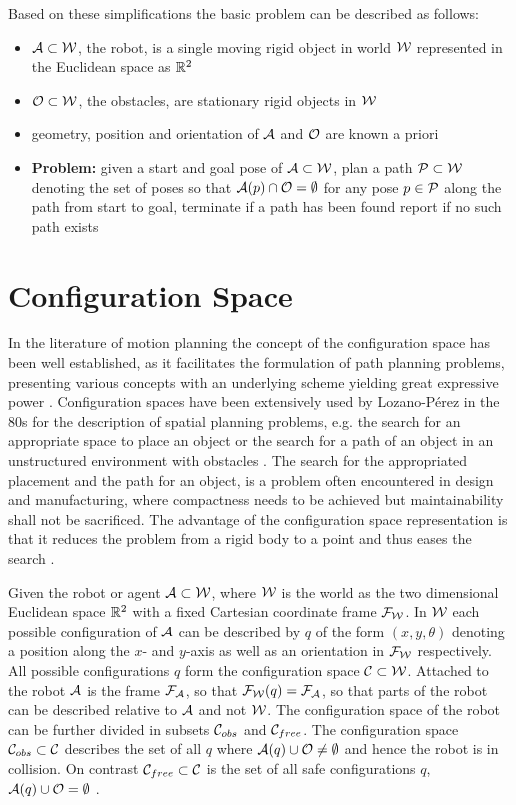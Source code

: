 Based on these simplifications the basic problem can be described as follows:
\begin{itemize}
\item $\mathcal{A} \subset \mathcal{W}$, the robot, is a single moving rigid object in world $\mathcal{W}$ represented in the Euclidean space as $\mathbb{R}^2$
\item $\mathcal{O} \subset \mathcal{W}$, the obstacles, are stationary rigid objects in $\mathcal{W}$
\item geometry, position and orientation of $\mathcal{A}$ and $\mathcal{O}$ are known a priori
\item \textbf{Problem:} given a start and goal pose of $\mathcal{A} \subset \mathcal{W}$, plan a path $\mathcal{P} \subset \mathcal{W}$ denoting the set of poses so that $\mathcal{A}(p) \cap \mathcal{O} = \emptyset$ for any pose  $p \in \mathcal{P}$ along the path from start to goal, terminate if a path has been found report if no such path exists
\end{itemize}

\cite{Latombe.1991} \cite{LaValle.2006}

\section{Configuration Space}
In the literature of motion planning the concept of the configuration space has been well established, as it facilitates the formulation of path planning problems, presenting various concepts with an underlying scheme yielding great expressive power \cite{LaValle.2006} \cite{Latombe.1991}. Configuration spaces have been extensively used by Lozano-P\'{e}rez in the 80s for the description of spatial planning problems, e.g. the search for an appropriate space to place an object or the search for a path of an object in an unstructured environment with obstacles \cite{Latombe.1991}. The search for the appropriated placement and the path for an object, is a problem often encountered in design and manufacturing, where compactness needs to be achieved but maintainability shall not be sacrificed. The advantage of the configuration space representation is that it reduces the problem from a rigid body to a point and thus eases the search \cite{LozanoPerez.1983}.

Given the robot or agent $\mathcal{A} \subset \mathcal{W}$, where $\mathcal{W}$ is the world as the two dimensional Euclidean space $\mathbb{R}^2$ with a fixed Cartesian coordinate frame $\mathcal{F}_{\mathcal{W}}$. In $\mathcal{W}$ each possible configuration of $\mathcal{A}$ can be described by $q$ of the form $(x,y,\theta)$ denoting a position along the $x$- and $y$-axis as well as an orientation in $\mathcal{F}_{\mathcal{W}}$ respectively. All possible configurations $q$ form the configuration space $\mathcal{C} \subset \mathcal{W}$. Attached to the robot $\mathcal{A}$ is the frame $\mathcal{F}_{\mathcal{A}}$, so that $\mathcal{F}_{\mathcal{W}}(q) = \mathcal{F}_{\mathcal{A}}$, so that parts of the robot can be described relative to $\mathcal{A}$ and not $\mathcal{W}$. The configuration space of the robot can be further divided in subsets $\mathcal{C}_{obs}$ and $\mathcal{C}_{free}$. The configuration space $\mathcal{C}_{obs} \subset \mathcal{C}$ describes the set of all $q$ where $\mathcal{A}(q) \cup \mathcal{O} \neq \emptyset$ and hence the robot is in collision. On contrast $\mathcal{C}_{free} \subset \mathcal{C}$ is the set of all safe configurations $q$, $\mathcal{A}(q) \cup \mathcal{O} = \emptyset$ \cite{Latombe.1991} \cite{LaValle.2006}.

